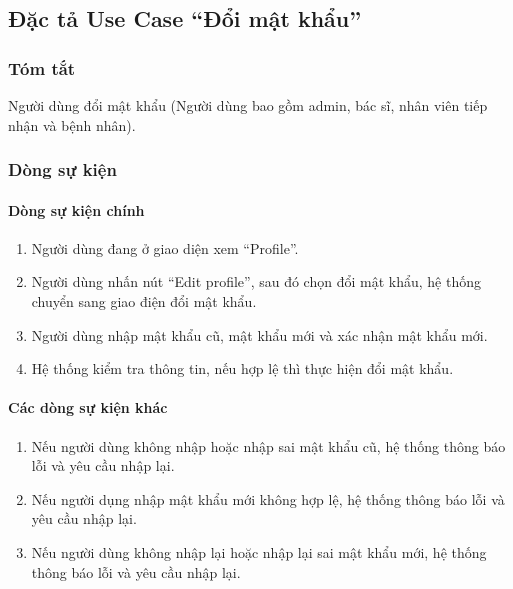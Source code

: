 \subsection{Đặc tả Use Case ``Đổi mật khẩu''}

\subsubsection{Tóm tắt}
Người dùng đổi mật khẩu (Người dùng bao gồm admin, bác sĩ, nhân viên tiếp nhận và bệnh nhân).

\subsubsection{Dòng sự kiện}
\paragraph{\textbf{Dòng sự kiện chính}}
\begin{enumerate}
  \item Người dùng đang ở giao diện xem ``Profile''.
  \item Người dùng nhấn nút ``Edit profile'', sau đó chọn đổi mật khẩu, hệ thống chuyển sang giao điện đổi mật khẩu.
  \item Người dùng nhập mật khẩu cũ, mật khẩu mới và xác nhận mật khẩu mới.
  \item Hệ thống kiểm tra thông tin, nếu hợp lệ thì thực hiện đổi mật khẩu.
\end{enumerate}

\paragraph{\textbf{Các dòng sự kiện khác}}
\begin{enumerate}
  \item Nếu người dùng không nhập hoặc nhập sai mật khẩu cũ, hệ thống thông báo lỗi và yêu cầu nhập lại.
  \item Nếu người dụng nhập mật khẩu mới không hợp lệ, hệ thống thông báo lỗi và yêu cầu nhập lại.
  \item Nếu người dùng không nhập lại hoặc nhập lại sai mật khẩu mới, hệ thống thông báo lỗi và yêu cầu nhập lại.
\end{enumerate}

